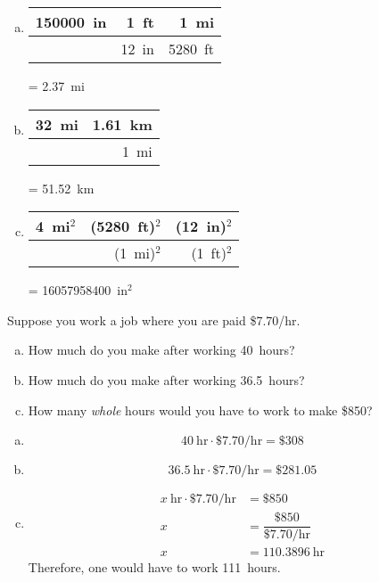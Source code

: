 \documentclass[11pt,letterpaper]{article}
\begin{document}
\sol
{\itshape
\begin{enumerate}[(a)]
\item \phantom{.}
	\begin{table}[!ht]
	\centering
	\begin{tabular}{r|r|r}
	150000~in & 1~ft & 1~mi \\ \hline
	& 12~in & 5280~ft
	\end{tabular}
	= 2.37~mi
	\end{table}

\item \phantom{.}
	\begin{table}[!ht]
	\centering
	\begin{tabular}{r|r}
	32~mi & 1.61~km \\ \hline
	& 1~mi
	\end{tabular}
	= 51.52~km
	\end{table}

\item \phantom{.}
	\begin{table}[!ht]
	\centering
	\begin{tabular}{r|r|r}
	4~mi$^2$ & (5280~ft)$^2$ & (12~in)$^2$ \\ \hline
	& (1~mi)$^2$ & (1~ft)$^2$
	\end{tabular}
	= 16057958400~in$^2$
	\end{table}
\end{enumerate}
}





\newpage





 Suppose you work a job where you are paid \$7.70/hr. 
\begin{enumerate}[(a)]
\item How much do you make after working 40~hours?
\item How much do you make after working 36.5~hours?
\item How many \textit{whole} hours would you have to work to make \$850?
\end{enumerate} \pspace

\sol 
{\itshape
\begin{enumerate}[(a)]
\item 
	\[
	40~\text{hr} \cdot \$7.70\text{/hr}= \$308
	\] \pspace

\item 
	\[
	36.5~\text{hr} \cdot \$7.70\text{/hr}= \$281.05
	\] \pspace

\item 
	\[
	\begin{aligned}
	x~\text{hr} \cdot \$7.70\text{/hr}&= \$850 \\[0.3cm]
	x&= \dfrac{\$850}{\$7.70\text{/hr}} \\[0.3cm]
	x&= 110.3896~\text{hr}
	\end{aligned}
	\] 
Therefore, one would have to work 111~hours. 
\end{enumerate}
}
\end{document}
